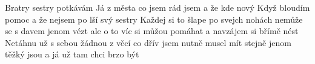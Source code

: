 \begin{TEXT}{Bratry sestry potkávám}
\SLOKA Já  z města   \NL
co  jsem rád jsem  \NL
a   že   \NL
kde  nový   
\REFREN  {} Když bloudím  pomoc  \NL
a  že nejsem  \NL
po  lší  \NL
svý  sestry  
\SLOKA Každej si to šlape po svejch nohách \NL
nemůže se s davem jenom vézt \NL
ale o to víc si můžou pomáhat \NL
a navzájem si břímě nést 
\SLOKA Netáhnu už s sebou žádnou z věcí \NL
co dřív jsem nutně musel mít \NL
stejně jenom těžký jsou \NL
a já už tam chci brzo být \NL
\end{TEXT}
